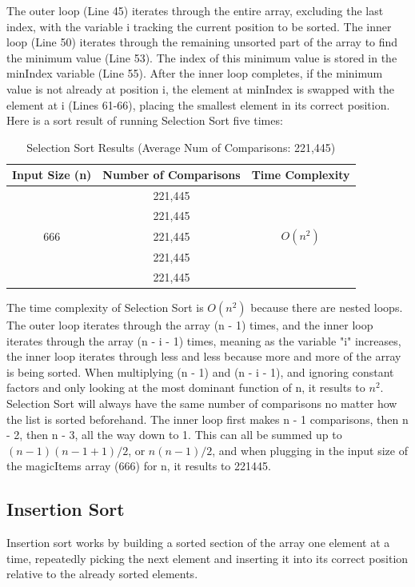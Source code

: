 \documentclass[letterpaper, 10pt]{article}
\begin{document}
\vspace{-0.5em}
\noindent
The outer loop (Line 45) iterates through the entire array, excluding the last index, with the variable i tracking the current position to be sorted. The inner loop (Line 50) iterates through the remaining unsorted part of the array to find the minimum value (Line 53). The index of this minimum value is stored in the minIndex variable (Line 55). After the inner loop completes, if the minimum value is not already at position i, the element at minIndex is swapped with the element at i (Lines 61-66), placing the smallest element in its correct position. Here is a sort result of running Selection Sort five times:
\begin{table}[H]
\centering
\begin{tabular}{|c|c|c|}
\hline
\textbf{Input Size (n)} & \textbf{Number of Comparisons} & \textbf{Time Complexity} \\
\hline
\multirow{5}{*}{666} & 221,445 & \\
                     & 221,445 & \\
                     & 221,445 & $O(n^2)$ \\
                     & 221,445 & \\
                     & 221,445 & \\
\hline
\end{tabular}
\caption{Selection Sort Results (Average Num of Comparisons: 221,445)}
\end{table}

\noindent
The time complexity of Selection Sort is $O(n^2)$ because there are nested loops. The outer loop iterates through the array (n - 1) times, and the inner loop iterates through the array (n - i - 1) times, meaning as the variable "i" increases, the inner loop iterates through less and less because more and more of the array is being sorted. When multiplying (n - 1) and (n - i - 1), and ignoring constant factors and only looking at the most dominant function of n, it results to $n^2$. Selection Sort will always have the same number of comparisons no matter how the list is sorted beforehand. The inner loop first makes n - 1 comparisons, then n - 2, then n - 3, all the way down to 1. This can all be summed up to $(n-1)(n-1+1)/2$, or $n(n-1)/2$, and when plugging in the input size of the magicItems array (666) for n, it results to 221445. 

\subsection{Insertion Sort}
\noindent
Insertion sort works by building a sorted section of the array one element at a time, repeatedly picking the next element and inserting it into its correct position relative to the already sorted elements.
\begin{figure}[H]
  \centering
  
  \label{fig:figure4.4-part1}
\end{figure}
\end{document}
